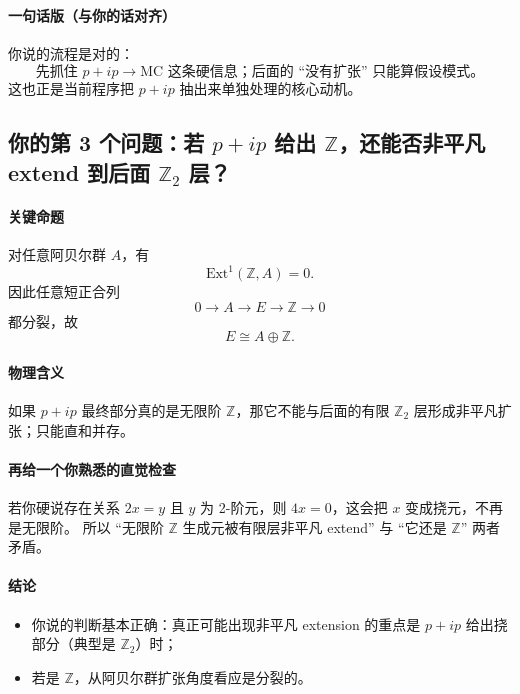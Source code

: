 \documentclass[a4paper,fontset=ubuntu,12pt]{ctexart}
\begin{document}
\paragraph{一句话版（与你的话对齐）}
你说的流程是对的：
\begin{equation}
\text{先抓住 }p+ip\to \text{MC 这条硬信息；后面的 ``没有扩张'' 只能算假设模式。}
\label{eq:ppip-single-z2-rule}
\end{equation}
这也正是当前程序把 $p+ip$ 抽出来单独处理的核心动机。

\subsection{你的第 3 个问题：若 $p+ip$ 给出 $\mathbb{Z}$，还能否非平凡 extend 到后面 $\mathbb{Z}_2$ 层？}

\paragraph{关键命题}
对任意阿贝尔群 $A$，有
\begin{equation}
\mathrm{Ext}^1(\mathbb{Z},A)=0.
\label{eq:ExtZzero}
\end{equation}
因此任意短正合列
\begin{equation}
0\to A\to E\to \mathbb{Z}\to 0
\label{eq:ses-Z}
\end{equation}
都分裂，故
\begin{equation}
E\cong A\oplus \mathbb{Z}.
\label{eq:split-Z}
\end{equation}

\paragraph{物理含义}
如果 $p+ip$ 最终部分真的是无限阶 $\mathbb{Z}$，那它不能与后面的有限 $\mathbb{Z}_2$ 层形成非平凡扩张；只能直和并存。

\paragraph{再给一个你熟悉的直觉检查}
若你硬说存在关系 $2x=y$ 且 $y$ 为 2-阶元，则 $4x=0$，这会把 $x$ 变成挠元，不再是无限阶。  
所以 ``无限阶 $\mathbb{Z}$ 生成元被有限层非平凡 extend'' 与 ``它还是 $\mathbb{Z}$'' 两者矛盾。

\paragraph{结论}
\begin{itemize}
\item 你说的判断基本正确：真正可能出现非平凡 extension 的重点是 $p+ip$ 给出挠部分（典型是 $\mathbb{Z}_2$）时；
\item 若是 $\mathbb{Z}$，从阿贝尔群扩张角度看应是分裂的。
\end{itemize}
\end{document}
